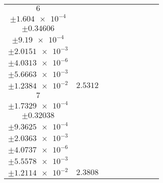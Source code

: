 \documentclass[8pt]{article}
\begin{document}
\begin{longtable}[l]{c c c c c c c c c}
$\num{6}$ & \begin{tabular}[c]{@{}c@{}}$\num{2.967e-2}$ \\ $\pm\num{1.604e-4}$\end{tabular} & \begin{tabular}[c]{@{}c@{}}$\num{0.71453}$ \\ $\pm\num{0.34606}$\end{tabular} & \begin{tabular}[c]{@{}c@{}}$\num{6.9451}$ \\ $\pm\num{9.19e-4}$\end{tabular} & \begin{tabular}[c]{@{}c@{}}$\num{737.62}$ \\ $\pm\num{2.0151e-3}$\end{tabular} & \begin{tabular}[c]{@{}c@{}}$\num{1.4756}$ \\ $\pm\num{4.0313e-6}$\end{tabular} & \begin{tabular}[c]{@{}c@{}}$\num{1.1666}$ \\ $\pm\num{5.6663e-3}$\end{tabular} & \begin{tabular}[c]{@{}c@{}}$\num{4.1144}$ \\ $\pm\num{1.2384e-2}$\end{tabular} & $\num{2.5312}$\\
$\num{7}$ & \begin{tabular}[c]{@{}c@{}}$\num{3.0153e-2}$ \\ $\pm\num{1.7329e-4}$\end{tabular} & \begin{tabular}[c]{@{}c@{}}$\num{0.46839}$ \\ $\pm\num{0.32038}$\end{tabular} & \begin{tabular}[c]{@{}c@{}}$\num{7.4055}$ \\ $\pm\num{9.3625e-4}$\end{tabular} & \begin{tabular}[c]{@{}c@{}}$\num{738.08}$ \\ $\pm\num{2.0363e-3}$\end{tabular} & \begin{tabular}[c]{@{}c@{}}$\num{1.4766}$ \\ $\pm\num{4.0737e-6}$\end{tabular} & \begin{tabular}[c]{@{}c@{}}$\num{1.1818}$ \\ $\pm\num{5.5578e-3}$\end{tabular} & \begin{tabular}[c]{@{}c@{}}$\num{4.1231}$ \\ $\pm\num{1.2114e-2}$\end{tabular} & $\num{2.3808}$\\

\end{longtable}
\end{document}
